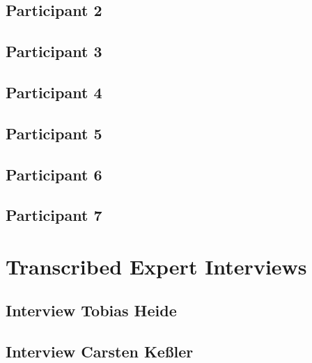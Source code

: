 \subsection{Participant 2}
  

\subsection{Participant 3}
  

\subsection{Participant 4}
  

\subsection{Participant 5}
  

\subsection{Participant 6}
  

\subsection{Participant 7}
  

\section{Transcribed Expert Interviews}

\subsection{Interview Tobias Heide}
  
\subsection{Interview Carsten Ke{\ss}ler}
  
  